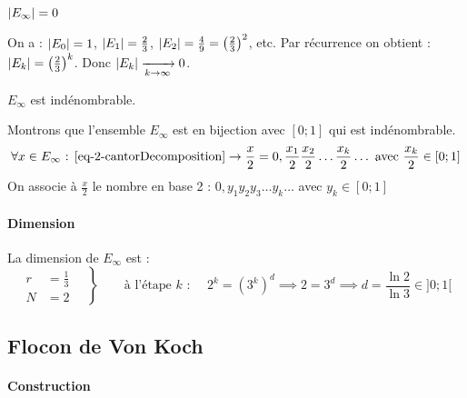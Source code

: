 			\begin{propShort}
				$\lvert E_\infty \rvert = 0$
			\end{propShort}
			\begin{preuve}
				On a : $\lvert E_0 \rvert = 1$, $\lvert E_1 \rvert = \frac{2}{3}$, $\lvert E_2 \rvert = \frac{4}{9} = \left(\frac{2}{3}\right)^2$, etc.
				Par récurrence on obtient : $ \lvert E_k \rvert = \left( \frac{2}{3}\right)^k $.
				Donc $\lvert E_k \rvert \xrightarrow[k \to \infty]{} 0$.
			\end{preuve}
					

			\begin{propShort}
				$E_\infty$ est indénombrable.
			\end{propShort}
			\begin{preuve}
				Montrons que l'ensemble $E_\infty$ est en bijection avec $[0;1]$ qui est indénombrable.
				$$
					\forall x \in E_\infty \text{ : } \eqref{eq-2-cantorDecomposition} \to \frac{x}{2} = 0,\frac{x_1}{2}\frac{x_2}{2}\ldots\frac{x_k}{2}\ldots \text{ avec } \frac{x_k}{2}\in [0;1]
				$$
				On associe à $\frac{x}{2}$ le nombre en base 2 : $0,y_1y_2y_3\ldots y_k\ldots$ avec $y_k \in [0;1]$
			\end{preuve}

		\paragraph{Dimension}

			La dimension de $E_\infty$ est :
			$$
				\left.\begin{aligned}
					r &= \frac{1}{3}	\quad	\\
					N &= 2	\quad
					\end{aligned}
				\right\}
				\qquad \text{à l'étape $k$ : } \quad 2^k=(3^k)^d \implies 2=3^d \implies d= \frac{\ln{2}}{\ln{3}} \in ]0;1[
			$$


	\subsection{Flocon de Von Koch}



		\paragraph{Construction}

